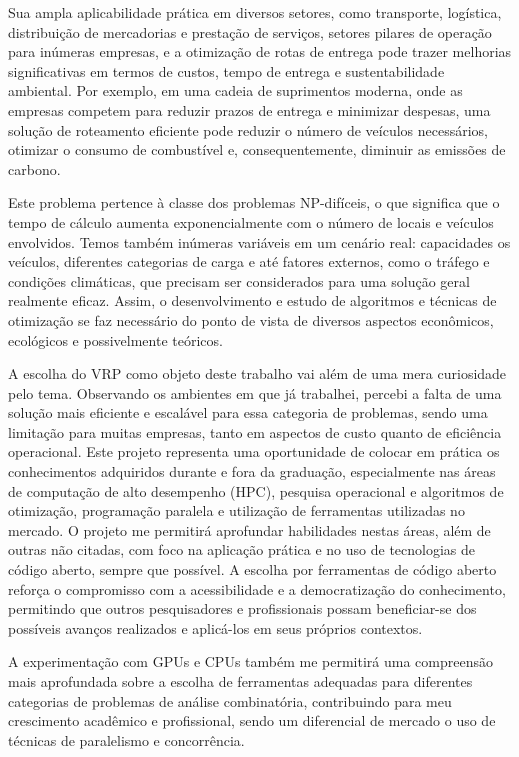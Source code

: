 \documentclass[
    openany,
    12pt,
    a4paper,
    twoside,
    english,
    brazil, sumario=tradicional
]{/home/lucas_galdino/Desktop/TCC/planning/abntex2/abntex2}
\begin{document}
Sua ampla aplicabilidade prática em diversos setores, como transporte, logística, distribuição de mercadorias e prestação de serviços, setores pilares de operação para inúmeras empresas, e a otimização de rotas de entrega pode trazer melhorias significativas em termos de custos, tempo de entrega e sustentabilidade ambiental. Por exemplo, em uma cadeia de suprimentos moderna, onde as empresas competem para reduzir prazos de entrega e minimizar despesas, uma solução de roteamento eficiente pode reduzir o número de veículos necessários, otimizar o consumo de combustível e, consequentemente, diminuir as emissões de carbono.

Este problema pertence à classe dos problemas NP-difíceis, o que significa que o tempo de cálculo aumenta exponencialmente com o número de locais e veículos envolvidos. Temos também inúmeras variáveis em um cenário real: capacidades os veículos, diferentes categorias de carga e até fatores externos, como o tráfego e condições climáticas, que precisam ser considerados para uma solução geral realmente eficaz. Assim, o desenvolvimento e estudo de algoritmos e técnicas de otimização se faz necessário do ponto de vista de diversos aspectos econômicos, ecológicos e possivelmente teóricos.

A escolha do VRP como objeto deste trabalho vai além de uma mera curiosidade pelo tema. Observando os ambientes em que já trabalhei, percebi a falta de uma solução mais eficiente e escalável para essa categoria de problemas, sendo uma limitação para muitas empresas, tanto em aspectos de custo quanto de eficiência operacional. Este projeto representa uma oportunidade de colocar em prática os conhecimentos adquiridos durante e fora da graduação, especialmente nas áreas de computação de alto desempenho (HPC), pesquisa operacional e algoritmos de otimização, programação paralela e utilização de ferramentas utilizadas no mercado. O projeto me permitirá aprofundar habilidades nestas áreas, além de outras não citadas, com foco na aplicação prática e no uso de tecnologias de código aberto, sempre que possível. A escolha por ferramentas de código aberto reforça o compromisso com a acessibilidade e a democratização do conhecimento, permitindo que outros pesquisadores e profissionais possam beneficiar-se dos possíveis avanços realizados e aplicá-los em seus próprios contextos.

A experimentação com GPUs e CPUs também me permitirá uma compreensão mais aprofundada sobre a escolha de ferramentas adequadas para diferentes categorias de problemas de análise combinatória, contribuindo para meu crescimento acadêmico e profissional, sendo um diferencial de mercado o uso de técnicas de paralelismo e concorrência.
\end{document}
